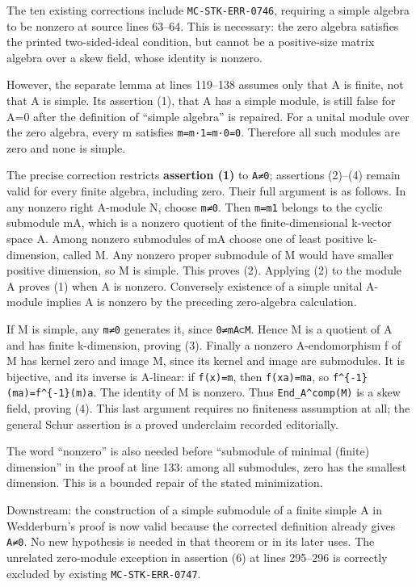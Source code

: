 \documentclass[11pt]{article}
\begin{document}
The ten existing corrections include \texttt{MC-STK-ERR-0746}, requiring a simple algebra to be nonzero at source lines 63--64. This is necessary: the zero algebra satisfies the printed two-sided-ideal condition, but cannot be a positive-size matrix algebra over a skew field, whose identity is nonzero.

However, the separate lemma at lines 119--138 assumes only that A is finite, not that A is simple. Its assertion (1), that A has a simple module, is still false for A=0 after the definition of ``simple algebra'' is repaired. For a unital module over the zero algebra, every m satisfies \texttt{m=m·1=m·0=0}. Therefore all such modules are zero and none is simple.

The precise correction restricts \textbf{assertion (1)} to \texttt{A≠0}; assertions (2)--(4) remain valid for every finite algebra, including zero. Their full argument is as follows. In any nonzero right A-module N, choose \texttt{m≠0}. Then \texttt{m=m1} belongs to the cyclic submodule mA, which is a nonzero quotient of the finite-dimensional k-vector space A. Among nonzero submodules of mA choose one of least positive k-dimension, called M. Any nonzero proper submodule of M would have smaller positive dimension, so M is simple. This proves (2). Applying (2) to the module A proves (1) when A is nonzero. Conversely existence of a simple unital A-module implies A is nonzero by the preceding zero-algebra calculation.

If M is simple, any \texttt{m≠0} generates it, since \texttt{0≠mA⊂M}. Hence M is a quotient of A and has finite k-dimension, proving (3). Finally a nonzero A-endomorphism f of M has kernel zero and image M, since its kernel and image are submodules. It is bijective, and its inverse is A-linear: if \texttt{f(x)=m}, then \texttt{f(xa)=ma}, so \texttt{f\^{}\{-1\}(ma)=f\^{}\{-1\}(m)a}. The identity of M is nonzero. Thus \texttt{End\_A\^{}comp(M)} is a skew field, proving (4). This last argument requires no finiteness assumption at all; the general Schur assertion is a proved underclaim recorded editorially.

The word ``nonzero'' is also needed before ``submodule of minimal (finite) dimension'' in the proof at line 133: among all submodules, zero has the smallest dimension. This is a bounded repair of the stated minimization.

Downstream: the construction of a simple submodule of a finite simple A in Wedderburn's proof is now valid because the corrected definition already gives \texttt{A≠0}. No new hypothesis is needed in that theorem or in its later uses. The unrelated zero-module exception in assertion (6) at lines 295--296 is correctly excluded by existing \texttt{MC-STK-ERR-0747}.
\end{document}
